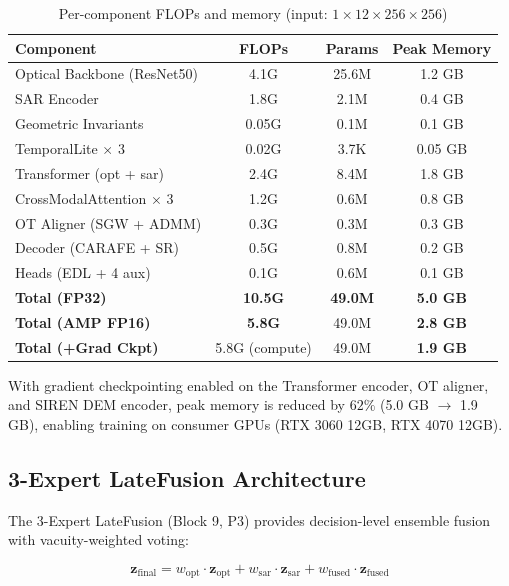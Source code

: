 \begin{table}[h]
\centering
\caption{Per-component FLOPs and memory (input: $1\times12\times256\times256$)}
\begin{tabular}{lccc}
\toprule
\textbf{Component} & \textbf{FLOPs} & \textbf{Params} & \textbf{Peak Memory} \\
\midrule
Optical Backbone (ResNet50) & 4.1G & 25.6M & 1.2 GB \\
SAR Encoder & 1.8G & 2.1M & 0.4 GB \\
Geometric Invariants & 0.05G & 0.1M & 0.1 GB \\
TemporalLite $\times$ 3 & 0.02G & 3.7K & 0.05 GB \\
Transformer (opt + sar) & 2.4G & 8.4M & 1.8 GB \\
CrossModalAttention $\times$ 3 & 1.2G & 0.6M & 0.8 GB \\
OT Aligner (SGW + ADMM) & 0.3G & 0.3M & 0.3 GB \\
Decoder (CARAFE + SR) & 0.5G & 0.8M & 0.2 GB \\
Heads (EDL + 4 aux) & 0.1G & 0.6M & 0.1 GB \\
\midrule
\textbf{Total (FP32)} & \textbf{10.5G} & \textbf{49.0M} & \textbf{5.0 GB} \\
\textbf{Total (AMP FP16)} & \textbf{5.8G} & 49.0M & \textbf{2.8 GB} \\
\textbf{Total (+Grad Ckpt)} & 5.8G (compute) & 49.0M & \textbf{1.9 GB} \\
\bottomrule
\end{tabular}
\end{table}

With gradient checkpointing enabled on the Transformer encoder, OT aligner,
and SIREN DEM encoder, peak memory is reduced by $62\%$ (5.0 GB $\to$ 1.9 GB),
enabling training on consumer GPUs (RTX 3060 12GB, RTX 4070 12GB).

\subsection{3-Expert LateFusion Architecture}

The 3-Expert LateFusion (Block 9, P3) provides decision-level ensemble
fusion with vacuity-weighted voting:

\begin{equation}
    \mathbf{z}_{\text{final}} = w_{\text{opt}} \cdot \mathbf{z}_{\text{opt}} +
    w_{\text{sar}} \cdot \mathbf{z}_{\text{sar}} +
    w_{\text{fused}} \cdot \mathbf{z}_{\text{fused}}
\end{equation}

